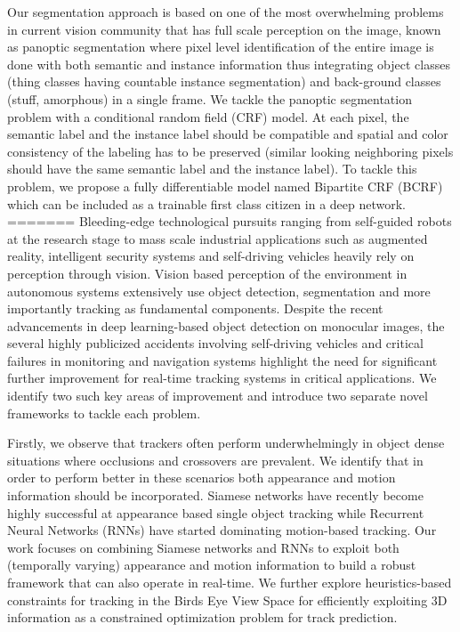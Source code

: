 Our segmentation approach is based on one of the most overwhelming problems in current vision community that has full scale perception on the image, known as panoptic segmentation where pixel level identification of the entire image is done with both semantic and instance information thus integrating object classes (thing classes having countable instance segmentation) and back-ground classes (stuff, amorphous) in a single frame. We tackle the panoptic segmentation problem with a conditional random field (CRF) model. At each pixel, the semantic label and the instance label should be compatible and spatial and color consistency of the labeling has to be preserved (similar looking neighboring pixels should have the same semantic label and the instance label). To tackle this problem, we propose a fully differentiable model named Bipartite CRF (BCRF) which can be included as a trainable first class citizen in a deep network.
=======
Bleeding-edge technological pursuits ranging from self-guided robots at the research stage to mass scale industrial applications such as augmented reality, intelligent security systems and self-driving vehicles heavily rely on perception through vision. Vision based perception of the environment in autonomous systems extensively use object detection, segmentation and more importantly tracking as fundamental components. Despite the recent advancements in deep learning-based object detection on monocular images, the several highly publicized accidents involving self-driving vehicles and critical failures in monitoring and navigation systems highlight the need for significant further improvement for real-time tracking systems in critical applications. We identify two such key areas of improvement and introduce two separate novel frameworks to tackle each problem. 

Firstly, we observe that trackers often perform underwhelmingly in object dense situations where occlusions and crossovers are prevalent. We identify that in order to perform better in these scenarios both appearance and motion information should be incorporated. Siamese networks have recently become highly successful at appearance based single object tracking while Recurrent Neural Networks (RNNs) have started dominating motion-based tracking. Our work focuses on combining Siamese networks and RNNs to exploit both (temporally varying) appearance and motion information to build a robust framework that can also operate in real-time. We further explore heuristics-based constraints for tracking in the Birds Eye View Space for efficiently exploiting 3D information as a constrained optimization problem for track prediction. 

